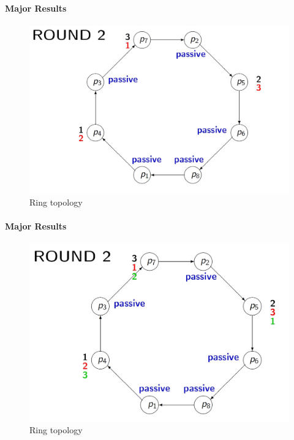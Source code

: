 \documentclass[11pt]{beamer}              %
\begin{document}
\begin{frame}{}
\framesubtitle{Major Results}

\begin{figure}
    \centering
    \includegraphics[scale=0.3]{figures/Screen13.jpg}
    \caption{Ring topology}
    \label{fig:Ring topology}
\end{figure}
\note{
}
\end{frame}


\begin{frame}{}
\framesubtitle{Major Results}

\begin{figure}
    \centering
    \includegraphics[scale=0.3]{figures/Screen14.jpg}
    \caption{Ring topology}
    \label{fig:Ring topology}
\end{figure}
\note{
}
\end{frame}
\end{document}
